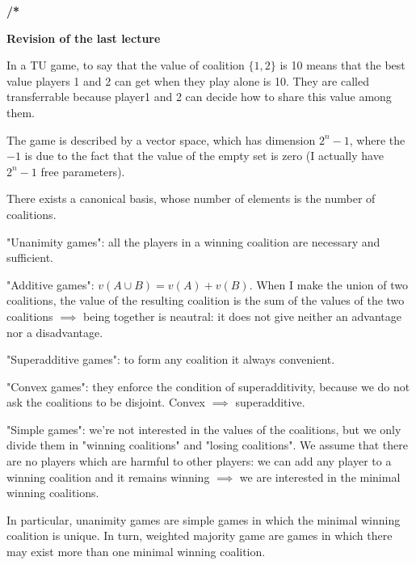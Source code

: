 
%



\bigskip
\noindent \textbf{/*}
	
\bigskip
\noindent \textbf{Revision of the last lecture}

\noindent In a TU game, to say that the value of coalition $\{1,2\}$ is 10 
means that the best value players 1 and 2 can get when they play alone is 10. 
They are called transferrable because player1 and 2 can decide how to share 
this value among them.

\noindent The game is described by a vector space, which has dimension $2^n-1$, 
where the $-1$ is due to the fact that the value of the empty set is zero (I actually have $2^n-1$ free parameters).

\noindent There exists a canonical basis, whose number of elements is the 
number of coalitions.

\noindent "Unanimity games": all the players in a winning coalition are 
necessary and sufficient.

\noindent "Additive games": $v(A \cup B) = v(A)+v(B)$. When I make the union of 
two coalitions, the value of the resulting coalition is the sum of the values 
of the two coalitions $\implies$ being together is neautral: it does not give 
neither an advantage nor a disadvantage.

\noindent "Superadditive games": to form any coalition it always convenient.  

\noindent "Convex games": they enforce the condition of superadditivity, because 
we do not ask the coalitions to be disjoint. Convex $\implies$ superadditive.

\noindent "Simple games": we're not interested in the values of the coalitions, 
but we only divide them in "winning coalitions" and "losing coalitions". We 
assume that there are no players which are harmful to other players: we can add 
any player to a winning coalition and it remains winning $\implies$ we are 
interested in the minimal winning coalitions.

\noindent In particular, unanimity games are simple games in which the minimal 
winning coalition is unique. In turn, weighted majority game are games in which 
there may exist more than one minimal winning coalition.

